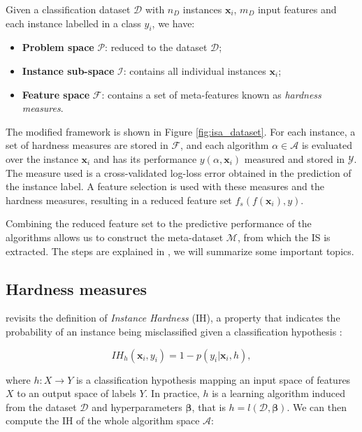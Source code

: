 Given a classification dataset $\mathcal{D}$ with $n_D$ instances $\mathbf{x}_i$, $m_D$ input features and each instance labelled in a class $y_i$, we have:

\begin{itemize}
	\item \textbf{Problem space} $\mathcal{P}$: reduced to the dataset $\mathcal{D}$;
	\item \textbf{Instance sub-space} $\mathcal{I}$: contains all individual instances $\mathbf{x}_i$;
	\item \textbf{Feature space} $\mathcal{F}$: contains a set of meta-features known as \emph{hardness measures}.
\end{itemize}

The modified framework is shown in Figure \ref{fig:isa_dataset}. For each instance, a set of hardness measures are stored in $\mathcal{F}$, and each algorithm $\alpha \in \mathcal{A}$ is evaluated over the instance $\mathbf{x}_i$ and has its performance $y(\alpha, \mathbf{x}_i)$ measured and stored in $\mathcal{Y}$. The measure used is a cross-validated log-loss error obtained in the prediction of the instance label. A feature selection is used with these measures and the hardness measures, resulting in a reduced feature set $f_s(f(\mathbf{x}_i), y)$.

Combining the reduced feature set to the predictive performance of the algorithms allows us to construct the meta-dataset $\mathcal{M}$, from which the IS is extracted. The steps are explained in \cite{Lorena2022}, we will summarize some important topics.

\subsection{Hardness measures} \label{subsec:hardness_measures}

\cite{Lorena2022} revisits the definition of \emph{Instance Hardness} (IH), a property that indicates the probability of an instance being misclassified given a classification hypothesis \cite{Smith2014}:

\begin{equation} \label{eq:instance_hardness}
	IH_h(\mathbf{x}_i, y_i) = 1 - p(y_i | \mathbf{x}_i, h),
\end{equation}

where $h: X \rightarrow Y$ is a classification hypothesis mapping an input space of features $X$ to an output space of labels $Y$. In practice, $h$ is a learning algorithm induced from the dataset $\mathcal{D}$ and hyperparameters $\mathbf{\beta}$, that is $h = l(\mathcal{D}, \mathbf{\beta})$. We can then compute the IH of the whole algorithm space $\mathcal{A}$:

